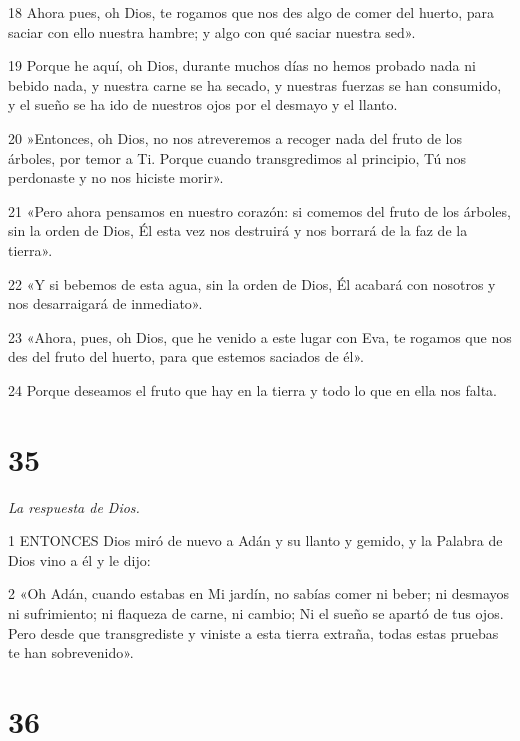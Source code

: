 \par 18 Ahora pues, oh Dios, te rogamos que nos des algo de comer del huerto, para saciar con ello nuestra hambre; y algo con qué saciar nuestra sed».

\par 19 Porque he aquí, oh Dios, durante muchos días no hemos probado nada ni bebido nada, y nuestra carne se ha secado, y nuestras fuerzas se han consumido, y el sueño se ha ido de nuestros ojos por el desmayo y el llanto.

\par 20 »Entonces, oh Dios, no nos atreveremos a recoger nada del fruto de los árboles, por temor a Ti. Porque cuando transgredimos al principio, Tú nos perdonaste y no nos hiciste morir».

\par 21 «Pero ahora pensamos en nuestro corazón: si comemos del fruto de los árboles, sin la orden de Dios, Él esta vez nos destruirá y nos borrará de la faz de la tierra».

\par 22 «Y si bebemos de esta agua, sin la orden de Dios, Él acabará con nosotros y nos desarraigará de inmediato».

\par 23 «Ahora, pues, oh Dios, que he venido a este lugar con Eva, te rogamos que nos des del fruto del huerto, para que estemos saciados de él».

\par 24 Porque deseamos el fruto que hay en la tierra y todo lo que en ella nos falta.

\chapter{35}

\par \textit{La respuesta de Dios.}

\par 1 ENTONCES Dios miró de nuevo a Adán y su llanto y gemido, y la Palabra de Dios vino a él y le dijo:

\par 2 «Oh Adán, cuando estabas en Mi jardín, no sabías comer ni beber; ni desmayos ni sufrimiento; ni flaqueza de carne, ni cambio; Ni el sueño se apartó de tus ojos. Pero desde que transgrediste y viniste a esta tierra extraña, todas estas pruebas te han sobrevenido».

\chapter{36}

